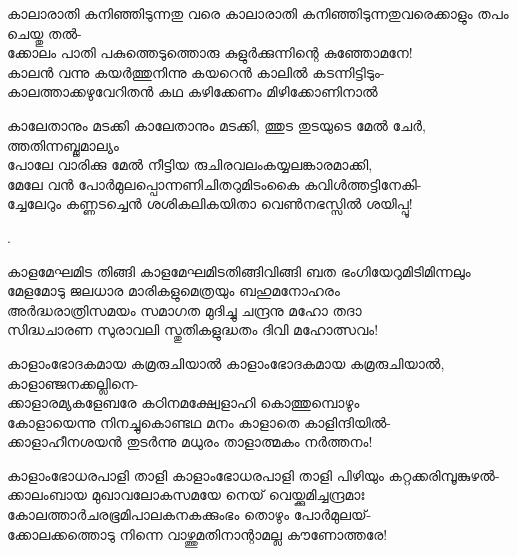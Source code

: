 \begin{enumerate}

\begin{slokam}{\VSv}{\SVL}{കാലാരാതി കനിഞ്ഞിടുന്നതു വരെ}
കാലാരാതി കനിഞ്ഞിടുന്നതുവരെക്കാളും തപം ചെയ്തു തൽ-\\
ക്കോലം പാതി പകുത്തെടുത്തൊരു കുളുർക്കുന്നിന്റെ കുഞ്ഞോമനേ!\\
കാലൻ വന്നു കയർത്തുനിന്നു കയറെൻ കാലിൽ കടന്നിട്ടിടും-\\
കാലത്താക്കഴുവേറിതൻ കഥ കഴിക്കേണം മിഴിക്കോണിനാൽ
\end{slokam}


\begin{slokam}{\VSr}{\VNM}{കാലേതാനും മടക്കി}
കാലേതാനും മടക്കി, ത്തുട തുടയുടെ മേൽ ചേർ, ത്തതിന്നബ്ജമാല്യം\\
പോലേ വാരിക്കു മേൽ നീട്ടിയ രുചിരവലംകയ്യലങ്കാരമാക്കി,\\
മേലേ വൻ പോർമുലപ്പൊന്നണിചിതറുമിടംകൈ കവിള്‍ത്തട്ടിനേകി-\\
ച്ചേലേറും കണ്ണടച്ചെൻ ശശികലികയിതാ വെൺനഭസ്സിൽ ശയിപ്പൂ!
\end{slokam}


.


\begin{slokam}{\VKm}{\KN}{കാളമേഘമിട തിങ്ങി}
കാളമേഘമിടതിങ്ങിവിങ്ങി ബത ഭംഗിയേറുമിടിമിന്നലും \\
മേളമോടു ജലധാര മാരികളുമെത്രയും ബഹുമനോഹരം \\
അർദ്ധരാത്രിസമയം സമാഗത മുദിച്ചു ചന്ദ്രനു മഹോ തദാ \\
സിദ്ധചാരണ സുരാവലി സ്തുതികളുദ്ധതം ദിവി മഹോത്സവം! 
\end{slokam}


\begin{slokam}{\VSv}{\Unk}{കാളാംഭോദകമായ കമ്രരുചിയാൽ}
കാളാംഭോദകമായ കമ്രരുചിയാൽ, കാളാഞ്ജനക്കല്ലിനെ-\\
ക്കാളാരമ്യകളേബരേ കഠിനമക്ഷ്വേളാഹി കൊത്തുമ്പൊഴും\\
കോളായെന്നു നിനച്ചുകൊണ്ടഥ മനം കാളാതെ കാളിന്ദിയിൽ-\\
ക്കാളാഹീനശയൻ തുടർന്നു മധുരം താളാത്മകം നർത്തനം!
\end{slokam}



\begin{slokam}{\VSv}{\Unk}{കാളാംഭോധരപാളി താളി}
കാളാംഭോധരപാളി താളി പിഴിയും കറ്റക്കരിമ്പൂങ്കുഴൽ-\\
ക്കാലംബായ മുഖാവലോകസമയേ നെയ്‌ വെയ്ക്കുമിച്ചന്ദ്രമാഃ\\
കോലത്താർചരഭൂമിപാലകനകക്കുംഭം തൊഴും പോർമുലയ്‌-\\
ക്കോലക്കത്തൊടു നിന്നെ വാഴ്ത്തുമതിനാന്റാമല്ല കൗണോത്തരേ!
\end{slokam}


\end{enumerate}
